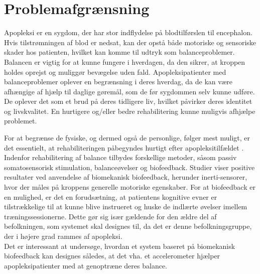 \section{Problemafgrænsning}
Apopleksi er en sygdom, der har stor indflydelse på blodtilførslen til encephalon. Hvis tilstrømningen af blod er nedsat, kan der opstå både motoriske og sensoriske skader hos patienten, hvilket kan komme til udtryk som balanceproblemer\cite{Hjernesagen2015a,Kruuse2015a}. Balancen er vigtig for at kunne fungere i hverdagen, da den sikrer, at kroppen holdes oprejst og muliggør bevægelse uden fald. \cite{Nichols1997} Apopleksipatienter med balanceproblemer oplever en begrænsning i deres hverdag, da de kan være afhængige af hjælp til daglige gøremål, som de før sygdommen selv kunne udføre\cite{Sundhedsstyrelsen2010}. De oplever det som et brud på deres tidligere liv, hvilket påvirker deres identitet og livskvalitet. \cite{Sundhedsstyrelsen2010} En hurtigere og/eller bedre rehabilitering kunne muligvis afhjælpe problemet.

\noindent For at begrænse de fysiske, og dermed også de personlige, følger mest muligt, er det essentielt, at rehabiliteringen påbegyndes hurtigt efter apopleksitilfældet \cite{Kruuse2015}. Indenfor rehabilitering af balance tilbydes forskellige metoder, såsom passiv somatosensorisk stimulation, balanceøvelser og biofeedback.\cite{Giggins2013} %
Studier viser positive resultater ved anvendelse af biomekanisk biofeedback, herunder inerti-sensorer, hvor der måles på kroppens generelle motoriske egenskaber. \cite{Giggins2013} For at biofeedback er en mulighed, er det en forudsætning, at patientens kognitive evner er tilstrækkelige til at kunne blive instrueret og huske de indlærte øvelser imellem træningssessionerne. \cite{Middaugh1989} Dette gør sig især gældende for den ældre del af befolkningen, som systemet skal designes til, da det er denne befolkningsgruppe, der i højere grad rammes af apopleksi. \cite{Sundhedsstyrelsen2011} \\
Det er interessant at undersøge, hvordan et system baseret på biomekanisk biofeedback kan designes således, at det vha. et accelerometer hjælper apopleksipatienter med at genoptræne deres balance. %

